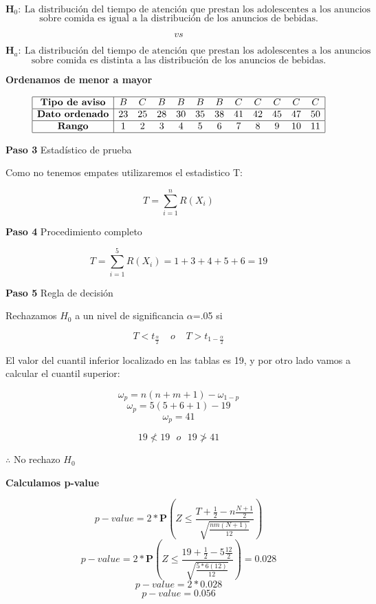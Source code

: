 \documentclass[
  a4paper,
  oneside,
  openany]{book}
\begin{document}
\[\textbf{H}_0: \ \mbox{La distribución del tiempo de atención que prestan los adolescentes a los 
anuncios}\]
\[\mbox{sobre comida es igual a la distribución de los anuncios de bebidas.}\]

\[vs\]

\[\textbf{H}_a: \ \mbox{La distribución del tiempo de atención que prestan los adolescentes a los anuncios}\]
\[\mbox{sobre comida es distinta a las distribución de los anuncios de bebidas.}\]

\textbf{Ordenamos de menor a mayor}

\[
\begin{array}{ |c| c c c c c c c c c c c| }
\hline
 \textbf{Tipo de aviso} & B & C & B & B & B & B & C & C & C & C & C \\ 
 \hline
 \textbf{Dato ordenado} & 23 & 25 & 28 & 30 & 35 & 38 & 41 & 42 & 45 & 47 & 50 \\ 
 \hline
 \textbf{Rango}         & 1 & 2 & 3 & 4 & 5 & 6 & 7 & 8 & 9 & 10 & 11 \\ 
 \hline
\end{array}
\]

\textbf{Paso 3} Estadístico de prueba

Como no tenemos empates utilizaremos el estadistico T:

\[T=\sum_{i=1}^{n}R(X_{i})\]

\textbf{Paso 4} Procedimiento completo

\[T=\sum_{i=1}^{5}R(X_{i})= 1+3+4+5+6= 19\]

\textbf{Paso 5} Regla de decisión

Rechazamos \(H_0\) a un nivel de significancia \(\alpha\)=.05 si

\[T < t_\frac{\alpha}{2} \ \ \  \ \  o  \ \ \ \ \  T > t_{1-\frac{\alpha}{2}}\]

El valor del cuantil inferior localizado en las tablas es 19, y por otro lado vamos a calcular el cuantil superior:

\[\omega_p= n(n+m+1)-\omega_{1-p}\]
\[\omega_p= 5(5+6+1)-19\]
\[\omega_p= 41\]

\[19 \nless   19  \ \ \  o \ \ \  19 \ngtr 41\]

\(\therefore\) No rechazo \(H_0\)

\textbf{Calculamos p-value}

\[p-value = 2*\mathbf{P}\left(Z\leq\frac{T+\frac{1}{2}-n\frac{N+1}{2}}{\sqrt{\frac{nm(N+1)}{12}}}\right)\]
\[p-value = 2*\mathbf{P}\left(Z\leq\frac{19+\frac{1}{2}-5\frac{12}{2}}{\sqrt{\frac{5*6(12)}{12}}}\right)=0.028\]
\[p-value = 2*0.028\]
\[p-value = 0.056\]
\end{document}
